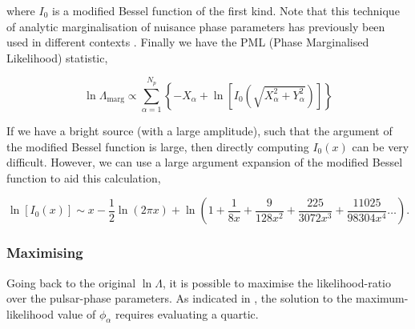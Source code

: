 \documentclass[prd,showpacs,nofootinbib]{revtex4}
\begin{document}
where $I_0$ is a modified Bessel function of the first kind. Note that this technique of analytic marginalisation of nuisance phase parameters has previously been used in different contexts \citep{whalen1971detection,F-and-G}. Finally we have the PML (Phase Marginalised Likelihood) statistic,

\begin{equation}
\ln\Lambda_{\text{marg}} \propto \sum_{\alpha=1}^{N_p}\left\{-X_{\alpha} + \ln\left[I_0\left(\sqrt{X_{\alpha}^2+Y_{\alpha}^2}\right)\right]\right\}
\end{equation}

If we have a bright source (with a large amplitude), such that the argument of the modified Bessel function is large, then directly computing $I_0(x)$ can be very difficult. However, we can use a large argument expansion of the modified Bessel function to aid this calculation,

\begin{equation}
 \ln\left[I_0(x)\right] \sim x-\frac{1}{2}\ln\left(2\pi x\right) + \ln\left(1+\frac{1}{8x}+\frac{9}{128x^2}+\frac{225}{3072x^3}+\frac{11025}{98304x^4}\ldots\right).
\end{equation}







\subsubsection{Maximising}

Going back to the original $\ln\Lambda$, it is possible to maximise the likelihood-ratio over the pulsar-phase parameters. As indicated in \citet{ellis_optimal}, the solution to the maximum-likelihood value of $\phi
_{\alpha}$ requires evaluating a quartic.
\end{document}
